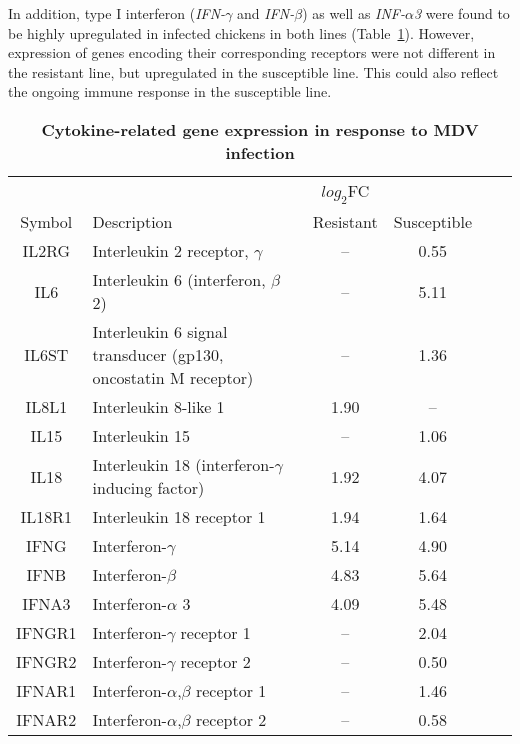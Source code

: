 In addition, type I interferon ({\em IFN-$\gamma$} and {\em
IFN-$\beta$}) as well as {\em INF-$\alpha$3} were found to be
highly upregulated in infected chickens in both lines
(Table~\ref{tab:cytokines}).
However, expression of genes encoding their corresponding
receptors were not different in the resistant line, but
upregulated in the susceptible line.  This could also reflect the
ongoing immune response in the susceptible line.

\begin{table}[!ht]
\caption{
\textbf{Cytokine-related gene expression in response to MDV infection}}
\begin{center}
    \begin{tabular}{c>{\centering}m{7cm}cccc}
        \hline
        & & $log_{2}$FC & \\
        Symbol & Description & Resistant & Susceptible \\
        \hline
        IL2RG & Interleukin 2 receptor, $\gamma$ & -- & 0.55 \\
        IL6 & Interleukin 6 (interferon, $\beta$ 2) & -- & 5.11 \\
        IL6ST & Interleukin 6 signal transducer (gp130, oncostatin M receptor) & -- & 1.36 \\
        IL8L1 & Interleukin 8-like 1 & 1.90 & -- \\
        IL15 & Interleukin 15 & -- & 1.06 \\
        IL18 & Interleukin 18 (interferon-$\gamma$ inducing factor) & 1.92 & 4.07 \\
        IL18R1 & Interleukin 18 receptor 1 & 1.94 & 1.64 \\
        IFNG & Interferon-$\gamma$ & 5.14 & 4.90 \\
        IFNB & Interferon-$\beta$ & 4.83 & 5.64 \\
        IFNA3 & Interferon-$\alpha$ 3 & 4.09 & 5.48 \\
        IFNGR1 & Interferon-$\gamma$ receptor 1 & -- & 2.04 \\
        IFNGR2 & Interferon-$\gamma$ receptor 2& -- & 0.50 \\
        IFNAR1 & Interferon-$\alpha$,$\beta$ receptor 1 & -- & 1.46 \\
        IFNAR2 & Interferon-$\alpha$,$\beta$ receptor 2 & -- & 0.58 \\
        \hline
    \end{tabular}
    \begin{flushleft}
    \end{flushleft}
    \label{tab:cytokines}
\end{center}
\end{table}
